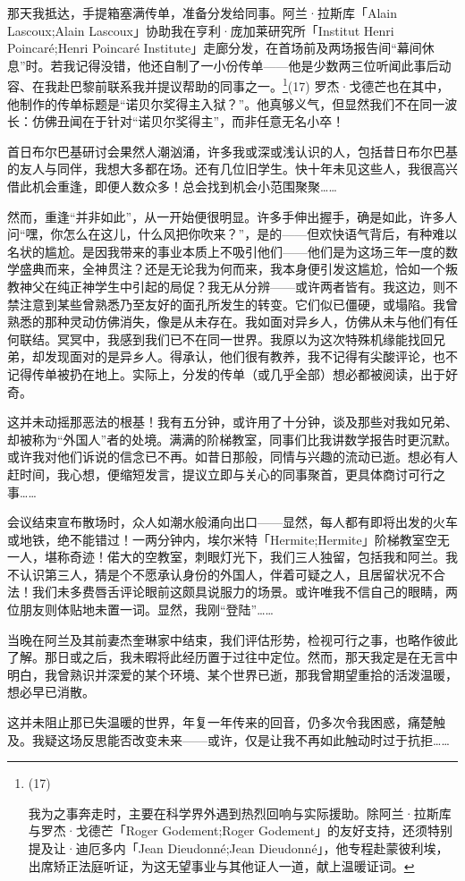 那天我抵达，手提箱塞满传单，准备分发给同事。阿兰·拉斯库「Alain Lascoux;Alain Lascoux」协助我在亨利·庞加莱研究所「Institut Henri Poincaré;Henri Poincaré Institute」走廊分发，在首场前及两场报告间“幕间休息”时。若我记得没错，他还自制了一小份传单——他是少数两三位听闻此事后动容、在我赴巴黎前联系我并提议帮助的同事之一。\footnote{(17)\par 我为之事奔走时，主要在科学界外遇到热烈回响与实际援助。除阿兰·拉斯库与罗杰·戈德芒「Roger Godement;Roger Godement」的友好支持，还须特别提及让·迪厄多内「Jean Dieudonné;Jean Dieudonné」，他专程赴蒙彼利埃，出席矫正法庭听证，为这无望事业与其他证人一道，献上温暖证词。}(17) 罗杰·戈德芒也在其中，他制作的传单标题是“诺贝尔奖得主入狱？”。他真够义气，但显然我们不在同一波长：仿佛丑闻在于针对“诺贝尔奖得主”，而非任意无名小卒！

首日布尔巴基研讨会果然人潮汹涌，许多我或深或浅认识的人，包括昔日布尔巴基的友人与同伴，我想大多都在场。还有几位旧学生。快十年未见这些人，我很高兴借此机会重逢，即便人数众多！总会找到机会小范围聚聚……

然而，重逢“并非如此”，从一开始便很明显。许多手伸出握手，确是如此，许多人问“嘿，你怎么在这儿，什么风把你吹来？”，是的——但欢快语气背后，有种难以名状的尴尬。是因我带来的事业本质上不吸引他们——他们是为这场三年一度的数学盛典而来，全神贯注？还是无论我为何而来，我本身便引发这尴尬，恰如一个叛教神父在纯正神学生中引起的局促？我无从分辨——或许两者皆有。我这边，则不禁注意到某些曾熟悉乃至友好的面孔所发生的转变。它们似已僵硬，或塌陷。我曾熟悉的那种灵动仿佛消失，像是从未存在。我如面对异乡人，仿佛从未与他们有任何联结。冥冥中，我感到我们已不在同一世界。我原以为这次特殊机缘能找回兄弟，却发现面对的是异乡人。得承认，他们很有教养，我不记得有尖酸评论，也不记得传单被扔在地上。实际上，分发的传单（或几乎全部）想必都被阅读，出于好奇。

这并未动摇那恶法的根基！我有五分钟，或许用了十分钟，谈及那些对我如兄弟、却被称为“外国人”者的处境。满满的阶梯教室，同事们比我讲数学报告时更沉默。或许我对他们诉说的信念已不再。如昔日那般，同情与兴趣的流动已逝。想必有人赶时间，我心想，便缩短发言，提议立即与关心的同事聚首，更具体商讨可行之事……

会议结束宣布散场时，众人如潮水般涌向出口——显然，每人都有即将出发的火车或地铁，绝不能错过！一两分钟内，埃尔米特「Hermite;Hermite」阶梯教室空无一人，堪称奇迹！偌大的空教室，刺眼灯光下，我们三人独留，包括我和阿兰。我不认识第三人，猜是个不愿承认身份的外国人，伴着可疑之人，且居留状况不合法！我们未多费唇舌评论眼前这颇具说服力的场景。或许唯我不信自己的眼睛，两位朋友则体贴地未置一词。显然，我刚“登陆”……

当晚在阿兰及其前妻杰奎琳家中结束，我们评估形势，检视可行之事，也略作彼此了解。那日或之后，我未暇将此经历置于过往中定位。然而，那天我定是在无言中明白，我曾熟识并深爱的某个环境、某个世界已逝，那我曾期望重拾的活泼温暖，想必早已消散。

这并未阻止那已失温暖的世界，年复一年传来的回音，仍多次令我困惑，痛楚触及。我疑这场反思能否改变未来——或许，仅是让我不再如此触动时过于抗拒……